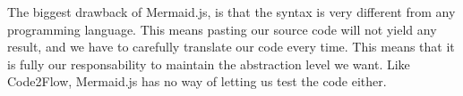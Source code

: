 The biggest drawback of Mermaid.js, is that the syntax is very different from any programming language. This means pasting our source code will not yield any result, and we have to carefully translate our code every time. This means that it is fully our responsability to maintain the abstraction level we want. Like Code2Flow, Mermaid.js has no way of letting us test the code either.